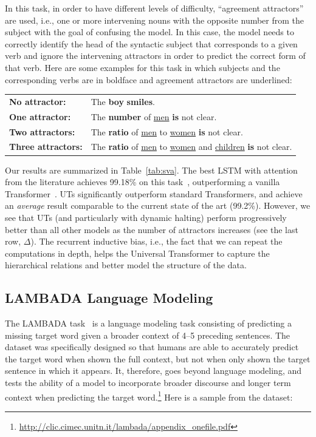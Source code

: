 

In this task, in order to have different levels of difficulty, ``agreement attractors'' are used, i.e., one or more intervening nouns with the opposite number from the subject with the goal of confusing the model. In this case, the model needs to correctly identify the head of the syntactic subject that corresponds to a given verb and ignore the intervening attractors in order to predict the correct form of that verb.
Here are some examples for this task in which subjects and the corresponding verbs are in boldface and agreement attractors are underlined:
\begin{table}[h!]
\fontsize{9}{10}\selectfont
\begin{tabular}{l l}
\textbf{No attractor:} & The \textbf{boy} \textbf{smiles}. \\
\textbf{One attractor:}  &  The \textbf{number} of \underline{men} \textbf{is} not clear. \\
\textbf{Two attractors:}  &  The \textbf{ratio} of \underline{men} to \underline{women} \textbf{is} not clear. \\
\textbf{Three attractors:} &  The \textbf{ratio} of \underline{men} to \underline{women} and \underline{children} \textbf{is} not clear. 
\end{tabular}
\end{table}
Our results are summarized in Table~\ref{tab:sva}. The best LSTM with attention from the literature achieves 99.18\% on this task~\citep{yogatama2018memory}, outperforming a vanilla Transformer~\citep{tran18}. UTs significantly outperform standard Transformers, and achieve an \emph{average} result comparable to the current state of the art (99.2\%). However, we see that UTs (and particularly with dynamic halting) perform progressively better than all other models as the number of attractors increases (see the last row, $\Delta$).
The recurrent inductive bias, i.e., the fact that we can repeat the computations in depth, helps the Universal Transformer to capture the hierarchical relations and better model the structure of the data.

\subsection{LAMBADA Language Modeling}
The LAMBADA task~\citep{paperno2016lambada} is a language modeling task consisting of predicting a missing target word given a broader context of 4--5 preceding sentences. The dataset was specifically designed so that humans are able to accurately predict the target word when shown the full context, but not when only shown the target sentence in which it appears. It, therefore, goes beyond language modeling, and tests the ability of a model to incorporate broader discourse and longer term context when predicting the target word.\footnote{\url{http://clic.cimec.unitn.it/lambada/appendix_onefile.pdf}}
Here is a sample from the dataset:

